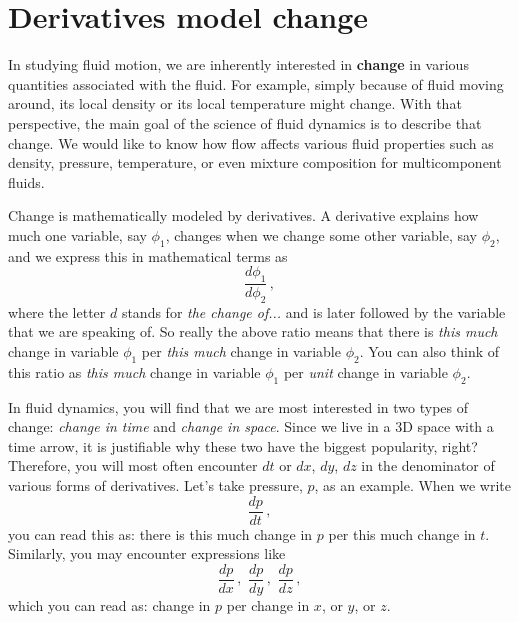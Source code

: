 

\section{Derivatives model change}

In studying fluid motion, we are inherently interested in \textbf{change} in various quantities associated with the fluid. For example, simply because of fluid moving around, its local density or its local temperature might change. With that perspective, the main goal of the science of fluid dynamics is to describe that change. We would like to know how flow affects various fluid properties such as density, pressure, temperature, or even mixture composition for multicomponent fluids.

Change is mathematically modeled by derivatives. A derivative explains how much one variable, say $\phi_1$, changes when we change some other variable, say $\phi_2$, and we express this in mathematical terms as
\begin{equation*}\label{eq:change-d}
\frac{d \phi_1}{d \phi_2} \, ,
\end{equation*}
where the letter $d$ stands for \textit{the change of...} and is later followed by the variable that we are speaking of. So really the above ratio means that there is \textit{this much} change in variable $\phi_1$ per \textit{this much} change in variable $\phi_2$. You can also think of this ratio as \textit{this much} change in variable $\phi_1$ per \textit{unit} change in variable $\phi_2$.

In fluid dynamics, you will find that we are most interested in two types of change: \textit{change in time} and \textit{change in space}. Since we live in a 3D space with a time arrow, it is justifiable why these two have the biggest popularity, right? Therefore, you will most often encounter $dt$ or $dx$, $dy$, $dz$ in the denominator of various forms of derivatives.
Let's take pressure, $p$, as an example. When we write
\begin{equation*}\label{eq:change-p}
\frac{d p}{d t} \, ,
\end{equation*}
you can read this as: there is this much change in $p$ per this much change in $t$.
Similarly, you may encounter expressions like
\begin{equation*}\label{eq:change-p}
\frac{d p}{d x} \,  , \,\, \frac{d p}{d y} \, , \,\, \frac{d p}{d z} \, ,
\end{equation*}
which you can read as: change in $p$ per change in $x$, or $y$, or $z$.

